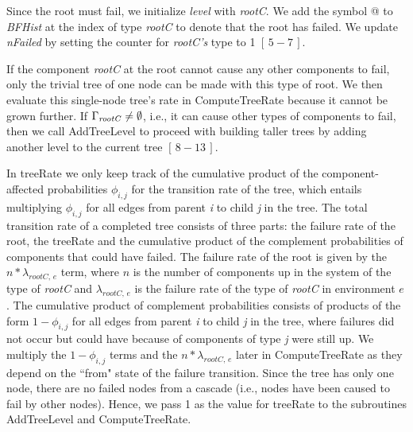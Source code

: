 \documentclass[12pt]{article}
\newcommand{\varName}[1]{\textrm{\it#1}}
\newcommand{\citeBlock}[2]{$[\,#1 - #2\,]$}
\begin{document}
Since the root must fail, we initialize \textit{level} with \textit{rootC}. We add the symbol @ to \textit{BFHist} at the index of type \textit{rootC} to denote that the root has failed. We update \textit{nFailed} by setting the counter for \varName{rootC's} type to 1 \citeBlock{5}{7}.

If the component \textit{rootC} at the root cannot cause any other components to fail, only the trivial tree of one node can be made with this type of root. We then evaluate this single-node tree's rate in ComputeTreeRate because it cannot be grown further. If $\Gamma_{\textrm{\textit{rootC}}} \neq \emptyset$, i.e., it can cause other types of components to fail, then we call AddTreeLevel to proceed with building taller trees by adding another level to the current tree \citeBlock{8}{13}.

In treeRate we only keep track of the cumulative product of the component-affected probabilities $\phi_{i,j}$ for the transition rate of the tree, which entails multiplying $\phi_{i, j}$ for all edges from parent \varName{i} to child \varName{j} in the tree. The total transition rate of a completed tree consists of three parts: the failure rate of the root, the treeRate and the cumulative product of the complement probabilities of components that could have failed. The failure rate of the root is given by the $n*\lambda_{rootC, \,e}$ term, where $n$ is the number of components up in the system of the type of \varName{rootC} and $\lambda_{rootC, \,e}$ is the failure rate of the type of \varName{rootC} in environment $e$. The cumulative product of complement probabilities consists of products of the form $1-\phi_{i, j}$ for all edges from parent \varName{i} to child \varName{j} in the tree, where failures did not occur but could have because of components of type \varName{j} were still up. We multiply the $1-\phi_{i,j}$ terms and the $n*\lambda_{rootC, \,e}$ later in ComputeTreeRate as they depend on the ``from" state of the failure transition. Since the tree has only one node, there are no failed nodes from a cascade (i.e., nodes have been caused to fail by other nodes). Hence, we pass 1 as the value for treeRate to the subroutines AddTreeLevel and ComputeTreeRate.
\end{document}
